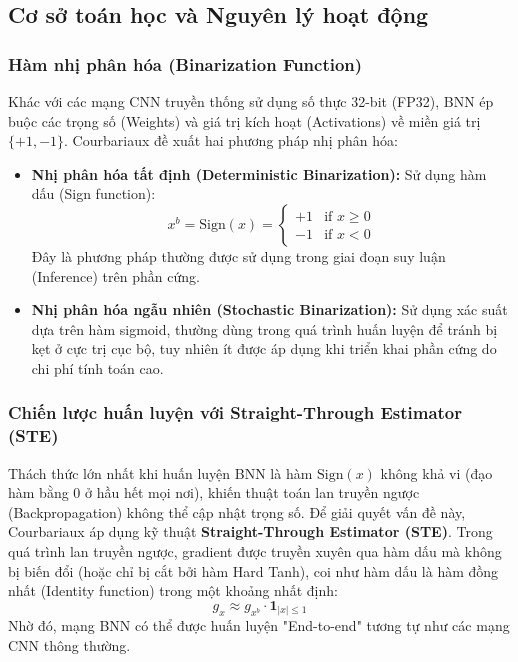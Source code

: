 \subsection{Cơ sở toán học và Nguyên lý hoạt động}

\subsubsection{Hàm nhị phân hóa (Binarization Function)}
Khác với các mạng CNN truyền thống sử dụng số thực 32-bit (FP32), BNN ép buộc các trọng số (Weights) 
và giá trị kích hoạt (Activations) về miền giá trị $\{+1, -1\}$. Courbariaux đề xuất hai phương pháp 
nhị phân hóa:
\begin{itemize}
    \item \textbf{Nhị phân hóa tất định (Deterministic Binarization):} Sử dụng hàm dấu (Sign function):
    \begin{equation}
        x^b = \text{Sign}(x) = \begin{cases} +1 & \text{if } x \geq 0 \\ -1 & \text{if } x < 0 \end{cases}
    \end{equation}
    Đây là phương pháp thường được sử dụng trong giai đoạn suy luận (Inference) trên phần cứng.
    \item \textbf{Nhị phân hóa ngẫu nhiên (Stochastic Binarization):} Sử dụng xác suất dựa trên 
    hàm sigmoid, thường dùng trong quá trình huấn luyện để tránh bị kẹt ở cực trị cục bộ, 
    tuy nhiên ít được áp dụng khi triển khai phần cứng do chi phí tính toán cao.
\end{itemize}

\subsubsection{Chiến lược huấn luyện với Straight-Through Estimator (STE)}
Thách thức lớn nhất khi huấn luyện BNN là hàm $\text{Sign}(x)$ không khả vi 
(đạo hàm bằng 0 ở hầu hết mọi nơi), khiến thuật toán lan truyền ngược (Backpropagation) không thể 
cập nhật trọng số.
Để giải quyết vấn đề này, Courbariaux áp dụng kỹ thuật \textbf{Straight-Through Estimator (STE)}. 
Trong quá trình lan truyền ngược, gradient được truyền xuyên qua hàm dấu mà không bị biến đổi 
(hoặc chỉ bị cắt bởi hàm Hard Tanh), coi như hàm dấu là hàm đồng nhất (Identity function) 
trong một khoảng nhất định:
\begin{equation}
    g_x \approx g_{x^b} \cdot \mathbf{1}_{|x| \le 1}
\end{equation}
Nhờ đó, mạng BNN có thể được huấn luyện "End-to-end" tương tự như các mạng CNN thông thường.

